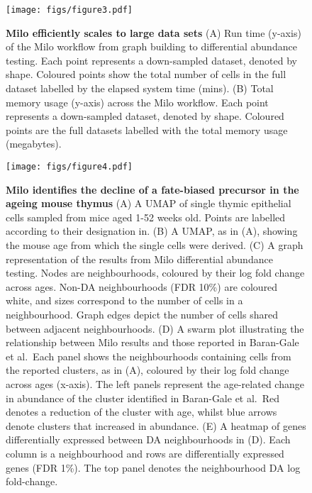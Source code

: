 \documentclass[
  10pt,
]{article}
\begin{document}
\begin{figure}
\centering
\texttt{[image: figs/figure3.pdf]}
\caption{\label{fig:fig-3}\textbf{Milo efficiently scales to large data sets}
(A) Run time (y-axis) of the Milo workflow from graph building to differential abundance testing. Each point represents a down-sampled dataset, denoted by shape. Coloured points show the total number of cells in the full dataset labelled by the elapsed system time (mins).
(B) Total memory usage (y-axis) across the Milo workflow. Each point represents a down-sampled dataset, denoted by shape. Coloured points are the full datasets labelled with the total memory usage (megabytes).}
\end{figure}





\begin{figure}
\centering
\texttt{[image: figs/figure4.pdf]}
\caption{\label{fig:fig-4}\textbf{Milo identifies the decline of a fate-biased precursor in the ageing mouse thymus}
(A) A UMAP of single thymic epithelial cells sampled from mice aged 1-52 weeks old. Points are labelled according to their designation in.
(B) A UMAP, as in (A), showing the mouse age from which the single cells were derived.
(C) A graph representation of the results from Milo differential abundance testing. Nodes are neighbourhoods, coloured by their log fold change across ages. Non-DA neighbourhoods (FDR 10\%) are coloured white, and sizes correspond to the number of cells in a neighbourhood. Graph edges depict the number of cells shared between adjacent neighbourhoods.
(D) A swarm plot illustrating the relationship between Milo results and those reported in Baran-Gale et al.~Each panel shows the neighbourhoods containing cells from the reported clusters, as in (A), coloured by their log fold change across ages (x-axis). The left panels represent the age-related change in abundance of the cluster identified in Baran-Gale et al.~Red denotes a reduction of the cluster with age, whilst blue arrows denote clusters that increased in abundance.
(E) A heatmap of genes differentially expressed between DA neighbourhoods in (D). Each column is a neighbourhood and rows are differentially expressed genes (FDR 1\%). The top panel denotes the neighbourhood DA log fold-change.}
\end{figure}
\end{document}
